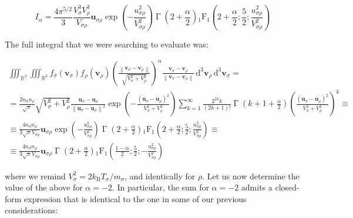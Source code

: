 \begin{equation*}
    I_\alpha = {\frac{4\pi^{5/2}}{3}}\frac{V_{\sigma}^3 V_\rho^3}{V_{\sigma\rho}}\mathbf{u}_{\sigma\rho}\exp{\left(-\frac{u_{\sigma\rho}^2}{V_{\sigma\rho}^2}\right)}\operatorname{\Gamma}{\left(2+\frac{\alpha}{2}\right)}\operatorname{_1F_1}{\left(2+\frac{\alpha}{2}; \frac{5}{2}; \frac{u_{\sigma\rho}^2}{V_{\sigma\rho}^2}\right)}
\end{equation*}

The full integral that we were searching to evaluate was:

\begin{gather*}
    \iiint_{\mathbb{R}^3}\iiint_{\mathbb{R}^3}f_\sigma(\mathbf{v}_\sigma)f_\rho(\mathbf{v}_\rho)\left(\frac{\left\|\mathbf{v}_\sigma-\mathbf{v}_\rho\right\|}{\sqrt{V_\sigma^2+V_\rho^2}}\right)^\alpha\frac{\mathbf{v}_\sigma-\mathbf{v}_\rho}{\left\|\mathbf{v}_\sigma-\mathbf{v}_\rho\right\|}\,\mathrm{d^3}\mathbf{v}_\rho\,\mathrm{d^3}\mathbf{v}_\sigma=\\
    =\frac{2n_\sigma n_\rho}{\sqrt{\pi}}\sqrt{V_\sigma^2+V_\rho^2}\frac{\mathbf{u}_{\sigma}-\mathbf{u}_\rho}{\left\|\mathbf{u}_\sigma-\mathbf{u}_\rho\right\|^2}\exp{\left(-\frac{\left(\mathbf{u}_\sigma-\mathbf{u}_\rho\right)^2}{V_\sigma^2+V_\rho^2}\right)}\sum_{k=1}^\infty \frac{2^{2k}k}{(2k+1)!}\operatorname{\Gamma}{\left(k+1+\frac{\alpha}{2}\right)}\left(\frac{\left(\mathbf{u}_\sigma-\mathbf{u}_\rho\right)^2}{V_\sigma^2+V_\rho^2}\right)^k\equiv\\
    \equiv{\frac{4 n_\sigma n_\rho}{3\sqrt{\pi}V_{\sigma\rho}}}\mathbf{u}_{\sigma\rho}\exp{\left(-\frac{u_{\sigma\rho}^2}{V_{\sigma\rho}^2}\right)}\operatorname{\Gamma}{\left(2+\frac{\alpha}{2}\right)}\operatorname{_1F_1}{\left(2+\frac{\alpha}{2};\frac{5}{2};\frac{u_{\sigma\rho}^2}{V_{\sigma\rho}^2}\right)}\equiv\\
    \equiv{\frac{4n_\sigma n_\rho}{3\sqrt{\pi}V_{\sigma\rho}}}\mathbf{u}_{\sigma\rho}\operatorname{\Gamma}{\left(2+\frac{\alpha}{2}\right)}\operatorname{_1F_1}{\left(\frac{1-\alpha}{2};\frac{5}{2};-\frac{u_{\sigma\rho}^2}{V_{\sigma\rho}^2}\right)}
\end{gather*}

where we remind $V_\sigma^2=2k_\text{B}T_\sigma/m_\sigma$, and identically for $\rho$. Let us now determine the value of the above for $\alpha=-2$. In particular, the sum for $\alpha=-2$ admits a closed-form expression that is identical to the one in some of our previous considerations:

